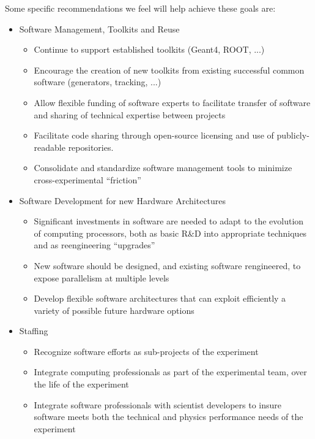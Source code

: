 Some specific recommendations we feel will help achieve these goals are:

\begin{itemize}
    \item Software Management, Toolkits and Reuse
    \begin{itemize}
        \item Continue to support established toolkits (Geant4, ROOT, ...)
        \item Encourage the creation of new toolkits from existing successful common software (generators, tracking, ...)
        \item  Allow flexible funding of software experts to facilitate transfer of software and sharing of technical expertise between projects
        \item Facilitate code sharing through open-source licensing and use of publicly-readable repositories.
        \item Consolidate and standardize software management tools to minimize cross-experimental ``friction''
    \end{itemize}

    \item Software Development for new Hardware Architectures
    \begin{itemize}
        \item Significant investments in software are needed to adapt to the evolution of computing processors, both as basic R\&D into appropriate
techniques and as reengineering ``upgrades''
        \item New software should be designed, and existing software rengineered, to expose parallelism at multiple levels
        \item Develop flexible software architectures that can exploit efficiently a variety of possible future hardware options
    \end{itemize}    

    \item Staffing
      \begin{itemize}
          \item Recognize software efforts as sub-projects of the experiment
          \item Integrate computing professionals as part of the experimental team, over the life of the experiment
          \item Integrate software professionals with scientist developers to insure software meets both the technical and physics performance needs of the experiment
      \end{itemize}


\end{itemize}
